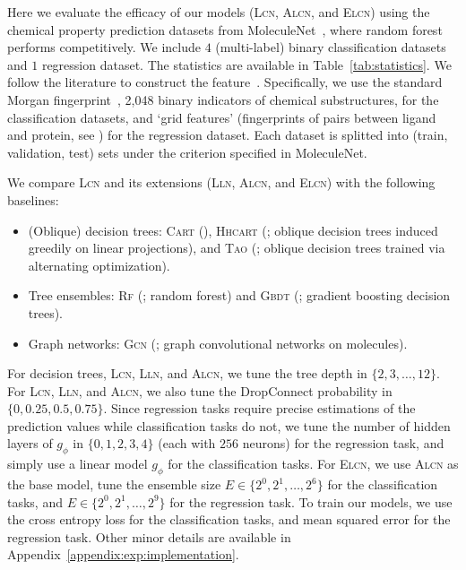 \documentclass{article} \usepackage{iclr2020_conference,times}
\begin{document}
Here we evaluate the efficacy of our models (\textsc{Lcn}, \textsc{Alcn}, and \textsc{Elcn}) using the chemical property prediction datasets from MoleculeNet~\citep{wu2018moleculenet}, where random forest performs competitively. We include $4$ (multi-label) binary classification datasets and $1$ regression dataset. The statistics are available in Table~\ref{tab:statistics}. We follow the literature to construct the feature~\citep{wu2018moleculenet}. Specifically, we use the standard Morgan fingerprint~\citep{rogers2010extended}, 2,048 binary indicators of chemical substructures, for the classification datasets, and `grid features' (fingerprints of pairs between ligand and protein, see \citet{wu2018moleculenet}) for the regression dataset. Each dataset is splitted into (train, validation, test) sets under the criterion specified in MoleculeNet. 

We compare \textsc{Lcn} and its extensions (\textsc{Lln}, \textsc{Alcn}, and \textsc{Elcn}) with the following baselines: 
\begin{itemize}[leftmargin=4mm]
\vspace{-2mm}
    \item (Oblique) decision trees: \textsc{Cart} (\citet{cart84}), \textsc{Hhcart} (\citet{wickramarachchi2016hhcart}; oblique decision trees induced greedily on linear projections), and \textsc{Tao} (\citet{carreira2018alternating}; oblique decision trees trained via alternating optimization).
\vspace{-1mm}
    \item Tree ensembles: \textsc{Rf} (\citet{breiman2001random}; random forest) and \textsc{Gbdt} (\citet{friedman2001greedy}; gradient boosting decision trees).
\vspace{-1mm}
    \item Graph networks: \textsc{Gcn} (\citet{duvenaud2015convolutional}; graph convolutional networks on molecules). 
\vspace{-2mm}
\end{itemize}
For decision trees, \textsc{Lcn}, \textsc{Lln}, and \textsc{Alcn}, we tune the tree depth in $\{2,3,\dots,12\}$. For \textsc{Lcn}, \textsc{Lln}, and \textsc{Alcn}, we also tune the DropConnect probability in $\{0, 0.25, 0.5, 0.75\}$. Since regression tasks require precise estimations of the prediction values while classification tasks do not, we tune the number of hidden layers of $g_\phi$ in $\{0,1,2,3,4\}$ (each with $256$ neurons) for the regression task, and simply use a linear model $g_\phi$ for the classification tasks. For \textsc{Elcn}, we use \textsc{Alcn} as the base model, tune the ensemble size $E \in \{2^0, 2^1,\dots,2^6\}$ for the classification tasks, and $E \in \{2^0, 2^1, \dots, 2^9\}$ for the regression task. To train our models, we use the cross entropy loss for the classification tasks, and mean squared error for the regression task. Other minor details are available in Appendix~\ref{appendix:exp:implementation}.
\end{document}
